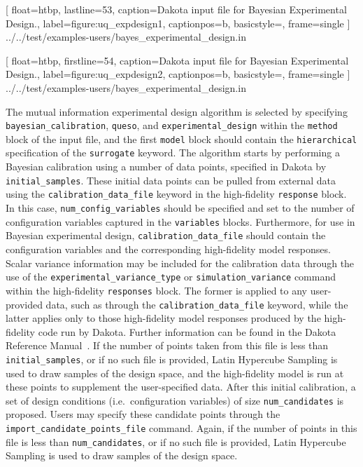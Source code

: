 \renewcommand{\thelstlisting}{\thechapter.\arabic{figure}}

[
float=htbp,
lastline=53,
caption={Dakota input file for Bayesian Experimental Design.}, 
label={figure:uq_expdesign1},
captionpos=b,
basicstyle=\small,
frame=single
]
{../../test/examples-users/bayes_experimental_design.in}

[
float=htbp,
firstline=54,
caption={Dakota input file for Bayesian Experimental Design.}, 
label={figure:uq_expdesign2},
captionpos=b,
basicstyle=\small,
frame=single
]
{../../test/examples-users/bayes_experimental_design.in}

The mutual information experimental design algorithm is selected by specifying 
\texttt{bayesian\_calibration}, \texttt{queso}, and 
\texttt{experimental\_design} within the \texttt{method} block of the input 
file, and the first \texttt{model} block should contain the 
\texttt{hierarchical} specification of the \texttt{surrogate} keyword. The 
algorithm starts by performing a Bayesian calibration using a number of data
points, specified in Dakota by \texttt{initial\_samples}. These initial data
points can be pulled from external data using the 
\texttt{calibration\_data\_file} keyword in the high-fidelity \texttt{response}
block. In this case, \texttt{num\_config\_variables} should be specified and 
set to the number of configuration variables captured in the \texttt{variables} 
blocks. Furthermore, for use in Bayesian experimental design, 
\texttt{calibration\_data\_file} should contain the configuration variables 
and the corresponding high-fidelity model responses. Scalar variance 
information may be included for the calibration data through the use of the 
\texttt{experimental\_variance\_type} or \texttt{simulation\_variance} command 
within the high-fidelity \texttt{responses} block. The former is applied to any 
user-provided data, such as through the \texttt{calibration\_data\_file} 
keyword, while the latter applies only to those high-fidelity model responses 
produced by the high-fidelity code run by Dakota. Further information can be 
found in the Dakota Reference Manual~\cite{RefMan}. If the number of points 
taken from this file is less than \texttt{initial\_samples}, or if no such 
file is provided, Latin Hypercube Sampling is used to draw samples of the 
design space, and the high-fidelity model is run at these points to supplement
the user-specified data. After this initial calibration, a set of design 
conditions (i.e.\ configuration variables) of size \texttt{num\_candidates} is 
proposed. Users may specify these candidate points through the 
\texttt{import\_candidate\_points\_file} command. Again, if the number of 
points in this file is less than \texttt{num\_candidates}, or if no such file 
is provided, Latin Hypercube Sampling is used to draw samples of the design 
space.  

